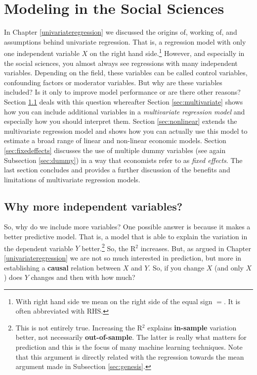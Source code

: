 \documentclass[
]{book}
\begin{document}
\hypertarget{modeling}{%
\chapter{Modeling in the Social Sciences}\label{modeling}}

In Chapter \ref{univariateregression} we discussed the origins of, working of, and assumptions behind univariate regression. That is, a regression model with only one independent variable \(X\) on the right hand side.\footnote{With right hand side we mean on the right side of the equal sign \(=\). It is often abbreviated with RHS.} However, and especially in the social sciences, you almost always see regressions with many independent variables. Depending on the field, these variables can be called control variables, confounding factors or moderator variables. But why are these variables included? Is it only to improve model performance or are there other reasons? Section \ref{sec:morevar} deals with this question whereafter Section \ref{sec:multivariate} shows how you can include additional variables in a \emph{multivariate regression model} and especially how you should interpret them. Section \ref{sec:nonlinear} extends the multivariate regression model and shows how you can actually use this model to estimate a broad range of linear and non-linear economic models. Section \ref{sec:fixedeffects} discusses the use of multiple dummy variables (see again Subsection \ref{sec:dummy}) in a way that economists refer to as \emph{fixed effects}. The last section concludes and provides a further discussion of the benefits and limitations of multivariate regression models.

\hypertarget{sec:morevar}{%
\section{Why more independent variables?}\label{sec:morevar}}

So, why do we include more variables? One possible answer is because it makes a better predictive model. That is, a model that is able to explain the variation in the dependent variable \(Y\) better.\footnote{This is not entirely true. Increasing the R\(^2\) explains \textbf{in-sample} variation better, not necessarily \textbf{out-of-sample}. The latter is really what matters for prediction and this is the focus of many machine learning techniques. Note that this argument is directly related with the regression towards the mean argument made in Subsection \ref{sec:genesis}.} So, the R\(^2\) increases. But, as argued in Chapter \ref{univariateregression} we are not so much interested in prediction, but more in establishing a \textbf{causal} relation between \(X\) and \(Y\). So, if you change \(X\) (and only \(X\)) does \(Y\) changes and then with how much?
\end{document}

